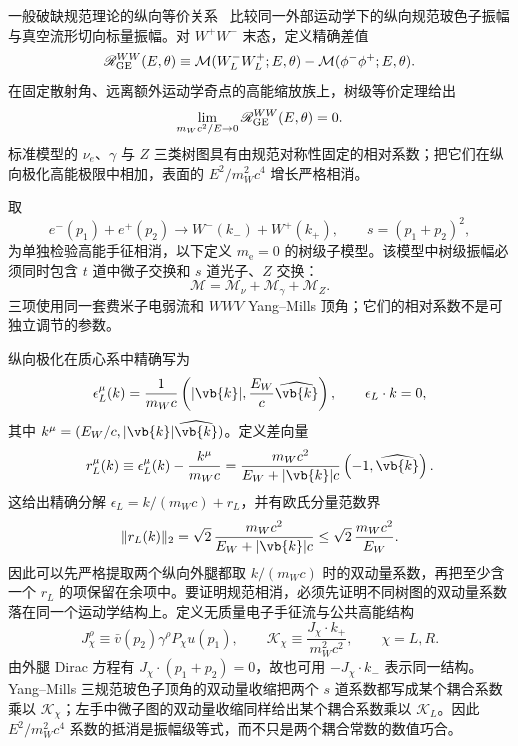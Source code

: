 一般破缺规范理论的纵向等价关系~ 比较同一外部运动学下的纵向规范玻色子振幅与真空流形切向标量振幅。对 $W^+W^-$ 末态，定义精确差值
\begin{equation}
{
\mathscr R_{\rm GE}^{WW}(E,\theta)
\equiv
\mathcal M(W_L^-W_L^+;E,\theta)
-\mathcal M(\phi^-\phi^+;E,\theta).}
\label{eq:eeww-equivalence-dp11}
\end{equation}
在固定散射角、远离额外运动学奇点的高能缩放族上，树级等价定理给出
\begin{equation*}
 \lim_{m_Wc^2/E\to0}\mathscr R_{\rm GE}^{WW}(E,\theta)=0.
\end{equation*}
标准模型的 $\nu_e$、$\gamma$ 与 $Z$ 三类树图具有由规范对称性固定的相对系数；把它们在纵向极化高能极限中相加，表面的 $E^2/m_W^2c^4$ 增长严格相消。

取
\begin{equation*}
e^-(p_1)+e^+(p_2)\to W^-(k_-)+W^+(k_+),
\qquad s=(p_1+p_2)^2,
\end{equation*}
为单独检验高能手征相消，以下定义 $m_{\mathrm e}=0$ 的树级子模型。该模型中树级振幅必须同时包含 $t$ 道中微子交换和 $s$ 道光子、$Z$ 交换：
\begin{equation}
\mathcal M=\mathcal M_\nu+\mathcal M_\gamma+\mathcal M_Z.
\label{eq:eeww-three-amplitudes-dp11}
\end{equation}
三项使用同一套费米子电弱流和 $WWV$ Yang--Mills 顶角；它们的相对系数不是可独立调节的参数。

纵向极化在质心系中精确写为
\begin{equation*}
\epsilon_L^\mu(k)
=\frac1{m_Wc}\left(|\vb{k}|,\frac{E_W}{c}\widehat{\vb{k}}\right),
\qquad \epsilon_L\cdot k=0,
\end{equation*}
其中 $k^\mu=(E_W/c,|\vb{k}|\widehat{\vb{k}})$。定义差向量
\begin{equation}
{
 r_L^\mu(k)
 \equiv\epsilon_L^\mu(k)-\frac{k^\mu}{m_Wc}
 =\frac{m_Wc^2}{E_W+|\vb{k}|c}
 \left(-1,\widehat{\vb{k}}\right).}
\label{eq:longitudinal-polarization-highE-dp11}
\end{equation}
这给出精确分解 $\epsilon_L=k/(m_Wc)+r_L$，并有欧氏分量范数界
\begin{equation*}
 \|r_L(k)\|_2
 =\sqrt2\,\frac{m_Wc^2}{E_W+|\vb{k}|c}
 \le\sqrt2\,\frac{m_Wc^2}{E_W}.
\end{equation*}
因此可以先严格提取两个纵向外腿都取 $k/(m_Wc)$ 时的双动量系数，再把至少含一个 $r_L$ 的项保留在余项中。要证明规范相消，必须先证明不同树图的双动量系数落在同一个运动学结构上。定义无质量电子手征流与公共高能结构
\begin{equation}
{
J_\chi^\rho\equiv\bar v(p_2)\gamma^\rho P_\chi u(p_1),
\qquad
\mathcal K_\chi\equiv
\frac{J_\chi\!\cdot k_+}{m_W^2c^2},
\qquad \chi=L,R.}
\label{eq:eeww-common-kinematic-structure-dp75}
\end{equation}
由外腿 Dirac 方程有 $J_\chi\!\cdot(p_1+p_2)=0$，故也可用 $-J_\chi\!\cdot k_-$ 表示同一结构。Yang--Mills 三规范玻色子顶角的双动量收缩把两个 $s$ 道系数都写成某个耦合系数乘以 $\mathcal K_\chi$；左手中微子图的双动量收缩同样给出某个耦合系数乘以 $\mathcal K_L$。因此 $E^2/m_W^2c^4$ 系数的抵消是振幅级等式，而不只是两个耦合常数的数值巧合。

